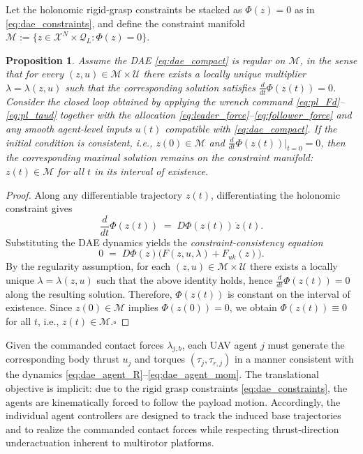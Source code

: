 \documentclass[letterpaper, 10 pt, conference]{ieeeconf}  %
\newcommand{\0}{\matr{0}}
\newtheorem{prop}{Proposition}
\begin{document}

Let the holonomic rigid-grasp constraints be stacked as $\Phi(z)=0$ as in \eqref{eq:dae_constraints}, and define the
constraint manifold $\mathcal M:=\{z\in\mathcal X^N\times\mathcal Q_L:\Phi(z)=0\}$.

\begin{prop}
\label{prop:constraint_invariance}
Assume the DAE \eqref{eq:dae_compact} is \emph{regular} on $\mathcal M$, in the sense that for every
$(z,u)\in\mathcal M\times\mathcal U$ there exists a locally unique multiplier
$\lambda=\lambda(z,u)$ such that the corresponding solution satisfies $\frac{d}{dt}\Phi(z(t))=0$.
Consider the closed loop obtained by applying the wrench command
\eqref{eq:pl_Fd}--\eqref{eq:pl_taud} together with the allocation
\eqref{eq:leader_force}--\eqref{eq:follower_force} and any smooth agent-level inputs $u(t)$ compatible with
\eqref{eq:dae_compact}. If the initial condition is consistent, i.e.,
$z(0)\in\mathcal M$ and $\frac{d}{dt}\Phi(z(t))\vert_{t=0}=0$,
then the corresponding maximal solution remains on the constraint manifold:
$z(t)\in\mathcal M$ for all $t$ in its interval of existence.
\end{prop}

\begin{proof}
Along any differentiable trajectory $z(t)$, differentiating the holonomic constraint gives
\[
\frac{d}{dt}\Phi(z(t)) \;=\; D\Phi(z(t))\,\dot z(t).
\]
Substituting the DAE dynamics yields the \emph{constraint-consistency equation}
\[
0 \;=\; D\Phi(z)\big(F(z,u,\lambda)+F_{uk}(z)\big).
\]
By the regularity assumption, for each $(z,u)\in\mathcal M\times\mathcal U$ there exists a locally unique
$\lambda=\lambda(z,u)$ such that the above identity holds, hence
$\frac{d}{dt}\Phi(z(t))=0$ along the resulting solution. Therefore, $\Phi(z(t))$ is constant on the interval of existence.
Since $z(0)\in\mathcal M$ implies $\Phi(z(0))=0$, we obtain $\Phi(z(t))\equiv 0$ for all $t$, i.e., $z(t)\in\mathcal M$.\hfill$\square$
\end{proof}


Given the commanded contact forces $\lambda_{j,b}$, each UAV agent $j$ must generate the corresponding body thrust $u_j$
and torques $(\tau_j,\tau_{r,j})$ in a manner consistent with the dynamics
\eqref{eq:dae_agent_R}--\eqref{eq:dae_agent_mom}. The translational objective is implicit: due to the rigid grasp constraints
\eqref{eq:dae_constraints}, the agents are kinematically forced to follow the payload motion. Accordingly, the individual
agent controllers are designed to track the induced base trajectories and to realize the commanded contact forces while
respecting thrust-direction underactuation inherent to multirotor platforms.
\end{document}
